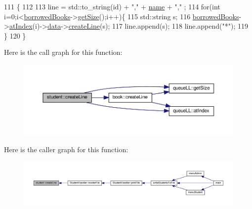 \begin{DoxyCode}
111                                         \{
112 
113         line = std::to\_string(\textcolor{keywordtype}{id}) + \textcolor{stringliteral}{","} + \hyperlink{classstudent_a8bba46a454eaecf8619a68c4c38c7b8d}{name} + \textcolor{stringliteral}{","} ;
114         \textcolor{keywordflow}{for}(\textcolor{keywordtype}{int} i=0;i<\hyperlink{classstudent_ab477f6c1525709586ea41364dc8c568b}{borrowedBooks}->\hyperlink{classqueue_l_l_a8969feebcb563f0b489bc112422b9563}{getSize}();i++)\{
115             std::string s;
116             \hyperlink{classstudent_ab477f6c1525709586ea41364dc8c568b}{borrowedBooks}->\hyperlink{classqueue_l_l_a6c8873be0f08b3b2e83a24469fbfaa5d}{atIndex}(i)->\hyperlink{classqueue_l_l_node_a20b1170d8c5852b7dc01e56fda4e4206}{data}->\hyperlink{classbook_aea835c54459ec0a4d29d42f2f6f7858d}{createLine}(s);
117             line.append(s);
118             line.append(\textcolor{stringliteral}{"*"});
119         \}
120 \}
\end{DoxyCode}
Here is the call graph for this function\+:
\nopagebreak
\begin{figure}[H]
\begin{center}
\leavevmode
\includegraphics[width=350pt]{classstudent_a4bc363a59fc8b14d81e8e5e0d2326444_cgraph}
\end{center}
\end{figure}
Here is the caller graph for this function\+:
\nopagebreak
\begin{figure}[H]
\begin{center}
\leavevmode
\includegraphics[width=350pt]{classstudent_a4bc363a59fc8b14d81e8e5e0d2326444_icgraph}
\end{center}
\end{figure}
\mbox{\label{classstudent_a27120d590ee93cc80c5b9d72d91a2eb3}} 
